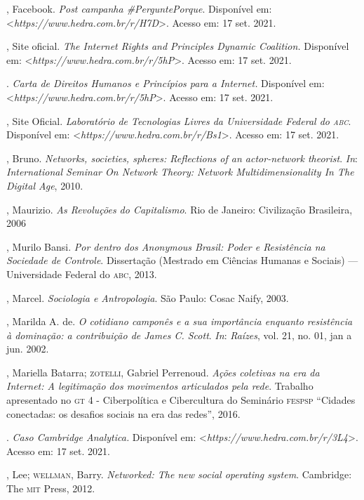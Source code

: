 \begin{bibliohedra}
, Facebook. \emph{Post campanha \#PerguntePorque}.
Disponível em: \textless{}\emph{https://www.hedra.com.br/r/H7D}\textgreater{}. Acesso em: 17 set. 2021.

, Site oficial. \emph{The Internet Rights and Principles Dynamic
Coalition.} Disponível em: \textless{}\emph{https://www.hedra.com.br/r/5hP}\textgreater{}. Acesso em: 17 set. 2021.

\titidem. \emph{Carta de Direitos Humanos e Princípios para
a Internet.} Disponível em: \textless{}\emph{https://www.hedra.com.br/r/5hP}\textgreater{}. Acesso em: 17 set. 2021.

, Site Oficial. \emph{Laboratório de Tecnologias Livres da
Universidade Federal do \textsc{abc}}. Disponível em: \textless{}\emph{https://www.hedra.com.br/r/Bs1}\textgreater{}. Acesso em: 17 set. 2021.

, Bruno. \emph{Networks, societies, spheres: Reflections of an
actor-network theorist}. \emph{In}: \emph{International Seminar On Network Theory:
Network Multidimensionality In The Digital Age}, 2010.

, Maurizio. \emph{As Revoluções do Capitalismo}. Rio de
Janeiro: Civilização Brasileira, 2006

, Murilo Bansi. \emph{Por dentro dos Anonymous Brasil: Poder e
Resistência na Sociedade de Controle}. Dissertação (Mestrado em Ciências
Humanas e Sociais) --- Universidade Federal do \textsc{abc}, 2013.

, Marcel. \emph{Sociologia e Antropologia}. São Paulo: Cosac
Naify, 2003.

, Marilda A. de. \emph{O cotidiano camponês e a sua importância enquanto
resistência à dominação: a contribuição de James C. Scott}. \emph{In}:
\emph{Raízes}, vol. 21, no. 01, jan a jun. 2002.

, Mariella Batarra; \textsc{zotelli}, Gabriel Perrenoud. \emph{Ações
coletivas na era da Internet: A legitimação dos movimentos articulados
pela rede}. Trabalho apresentado no \textsc{gt} 4 - Ciberpolítica e Cibercultura
do Seminário \textsc{fespsp} ``Cidades conectadas: os desafios sociais na era das
redes'', 2016.

. \emph{Caso Cambridge Analytica.} Disponível em:
\textless{}\emph{https://www.hedra.com.br/r/3L4}\textgreater{}. Acesso em: 17 set. 2021.

, Lee; \textsc{wellman}, Barry. \emph{Networked: The new social
operating system}. Cambridge: The \textsc{mit} Press, 2012.


\end{bibliohedra}
